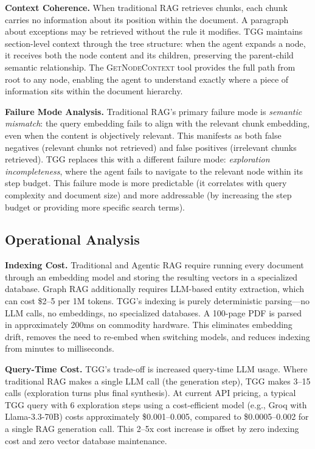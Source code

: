 \documentclass[conference]{IEEEtran}
\begin{document}
\textbf{Context Coherence.} When traditional RAG retrieves chunks, each chunk carries no information about its position within the document. A paragraph about exceptions may be retrieved without the rule it modifies. TGG maintains section-level context through the tree structure: when the agent expands a node, it receives both the node content and its children, preserving the parent-child semantic relationship. The \textsc{GetNodeContext} tool provides the full path from root to any node, enabling the agent to understand exactly where a piece of information sits within the document hierarchy.

\textbf{Failure Mode Analysis.} Traditional RAG's primary failure mode is \textit{semantic mismatch}: the query embedding fails to align with the relevant chunk embedding, even when the content is objectively relevant. This manifests as both false negatives (relevant chunks not retrieved) and false positives (irrelevant chunks retrieved). TGG replaces this with a different failure mode: \textit{exploration incompleteness}, where the agent fails to navigate to the relevant node within its step budget. This failure mode is more predictable (it correlates with query complexity and document size) and more addressable (by increasing the step budget or providing more specific search terms).

\subsection{Operational Analysis}

\textbf{Indexing Cost.} Traditional and Agentic RAG require running every document through an embedding model and storing the resulting vectors in a specialized database. Graph RAG additionally requires LLM-based entity extraction, which can cost \$2--5 per 1M tokens. TGG's indexing is purely deterministic parsing---no LLM calls, no embeddings, no specialized databases. A 100-page PDF is parsed in approximately 200ms on commodity hardware. This eliminates embedding drift, removes the need to re-embed when switching models, and reduces indexing from minutes to milliseconds.

\textbf{Query-Time Cost.} TGG's trade-off is increased query-time LLM usage. Where traditional RAG makes a single LLM call (the generation step), TGG makes 3--15 calls (exploration turns plus final synthesis). At current API pricing, a typical TGG query with 6 exploration steps using a cost-efficient model (e.g., Groq with Llama-3.3-70B) costs approximately \$0.001--0.005, compared to \$0.0005--0.002 for a single RAG generation call. This 2--5x cost increase is offset by zero indexing cost and zero vector database maintenance.
\end{document}
